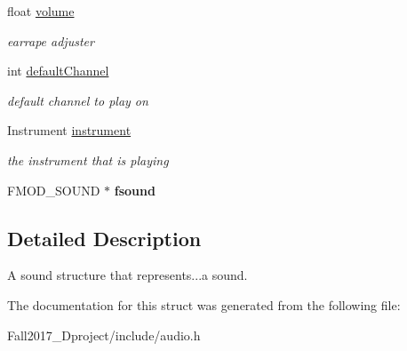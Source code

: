 \begin{DoxyCompactItemize}
\mbox{\label{structsound__s_a2c4fc8cb89f5f2aa3d8a7df38b34fdf4}} 
float \hyperlink{structsound__s_a2c4fc8cb89f5f2aa3d8a7df38b34fdf4}{volume}
\begin{DoxyCompactList}\small\item\em earrape adjuster \end{DoxyCompactList}\item 
\mbox{\label{structsound__s_a3aa7c97af690532eb7f83143dcb13839}} 
int \hyperlink{structsound__s_a3aa7c97af690532eb7f83143dcb13839}{default\+Channel}
\begin{DoxyCompactList}\small\item\em default channel to play on \end{DoxyCompactList}\item 
\mbox{\label{structsound__s_aa741df12e0b33f0552fb198750723572}} 
Instrument \hyperlink{structsound__s_aa741df12e0b33f0552fb198750723572}{instrument}
\begin{DoxyCompactList}\small\item\em the instrument that is playing \end{DoxyCompactList}\item 
\mbox{\label{structsound__s_ac47d76565b5a9c8532eb864e13c880d1}} 
F\+M\+O\+D\+\_\+\+S\+O\+U\+ND $\ast$ {\bfseries fsound}
\end{DoxyCompactItemize}


\subsection{Detailed Description}
A sound structure that represents...a sound. 

The documentation for this struct was generated from the following file\+:\begin{DoxyCompactItemize}
\item 
Fall2017\+\_\+Dproject/include/audio.\+h\end{DoxyCompactItemize}
